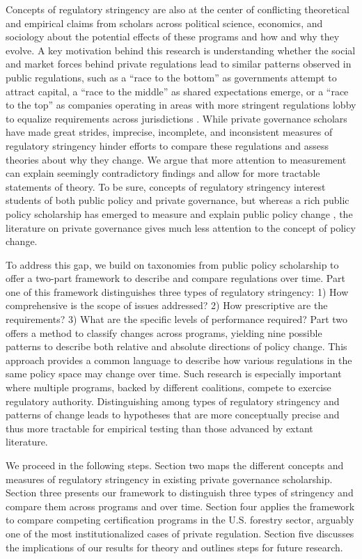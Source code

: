 \documentclass[
      12pt,
            Review ]{article}
\begin{document}
Concepts of regulatory stringency are also at the center of conflicting
theoretical and empirical claims from scholars across political science,
economics, and sociology about the potential effects of these programs
and how and why they evolve. A key motivation behind this research is
understanding whether the social and market forces behind private
regulations lead to similar patterns observed in public regulations,
such as a ``race to the bottom'' as governments attempt to attract
capital, a ``race to the middle'' as shared expectations emerge, or a
``race to the top'' as companies operating in areas with more stringent
regulations lobby to equalize requirements across jurisdictions
\citep{Berger1996, Rodrik2004, Vogel1995}. While private governance
scholars have made great strides, imprecise, incomplete, and
inconsistent measures of regulatory stringency hinder efforts to compare
these regulations and assess theories about why they change. We argue
that more attention to measurement can explain seemingly contradictory
findings and allow for more tractable statements of theory. To be sure,
concepts of regulatory stringency interest students of both public
policy and private governance, but whereas a rich public policy
scholarship has emerged to measure and explain public policy change
\citep{Green-Pedersen2007, Hall1993, Howlett2014}, the literature on
private governance gives much less attention to the concept of policy
change.

To address this gap, we build on taxonomies from public policy
scholarship to offer a two-part framework to describe and compare
regulations over time. Part one of this framework distinguishes three
types of regulatory stringency: 1) How comprehensive is the scope of
issues addressed? 2) How prescriptive are the requirements? 3) What are
the specific levels of performance required? Part two offers a method to
classify changes across programs, yielding nine possible patterns to
describe both relative and absolute directions of policy change. This
approach provides a common language to describe how various regulations
in the same policy space may change over time. Such research is
especially important where multiple programs, backed by different
coalitions, compete to exercise regulatory authority. Distinguishing
among types of regulatory stringency and patterns of change leads to
hypotheses that are more conceptually precise and thus more tractable
for empirical testing than those advanced by extant literature.

We proceed in the following steps. Section two maps the different
concepts and measures of regulatory stringency in existing private
governance scholarship. Section three presents our framework to
distinguish three types of stringency and compare them across programs
and over time. Section four applies the framework to compare competing
certification programs in the U.S. forestry sector, arguably one of the
most institutionalized cases of private regulation. Section five
discusses the implications of our results for theory and outlines steps
for future research.
\end{document}
